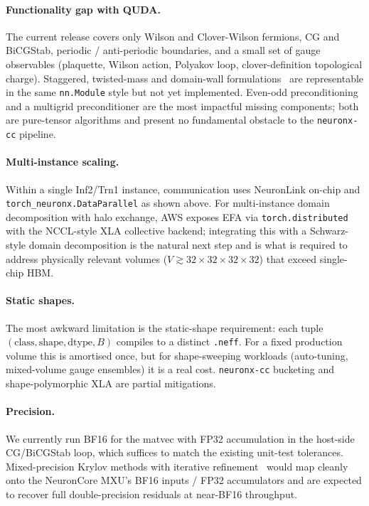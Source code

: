 \documentclass[a4paper,11pt]{article}
\newcommand{\NEFF}{\texttt{.neff}}
\begin{document}
\paragraph*{Functionality gap with QUDA.}
The current release covers only Wilson and Clover-Wilson fermions, CG
and BiCGStab, periodic / anti-periodic boundaries, and a small set of
gauge observables (plaquette, Wilson action, Polyakov loop,
clover-definition topological charge). Staggered, twisted-mass and
domain-wall formulations~\cite{Kogut:1974ag,Frezzotti:2000nk,Kaplan:1992bt}
are representable in the same \texttt{nn.Module} style but not yet implemented.
Even-odd preconditioning and a multigrid preconditioner are the most
impactful missing components; both are pure-tensor algorithms and
present no fundamental obstacle to the \texttt{neuronx-cc} pipeline.

\paragraph*{Multi-instance scaling.}
Within a single Inf2/Trn1 instance, communication uses NeuronLink
on-chip and \texttt{torch\_neuronx.DataParallel} as shown above. For
multi-instance domain decomposition with halo exchange, AWS exposes
EFA via \texttt{torch.distributed} with the NCCL-style XLA collective
backend; integrating this with a Schwarz-style domain decomposition
is the natural next step and is what is required to address physically
relevant volumes ($V\!\gtrsim\!32{\times}32{\times}32{\times}32$) that exceed single-chip HBM.

\paragraph*{Static shapes.}
The most awkward limitation is the static-shape requirement:
each tuple
$(\mathrm{class},\mathrm{shape},\mathrm{dtype},B)$
compiles to a distinct \NEFF. For a fixed production volume this is amortised once,
but for shape-sweeping workloads (auto-tuning, mixed-volume gauge
ensembles) it is a real cost. \texttt{neuronx-cc} bucketing and
shape-polymorphic XLA are partial mitigations.

\paragraph*{Precision.}
We currently run BF16 for the matvec with FP32 accumulation in the
host-side CG/BiCGStab loop, which suffices to match the existing
unit-test tolerances. Mixed-precision Krylov methods with iterative
refinement~\cite{Clark:2009wm} would map cleanly onto the NeuronCore
MXU's BF16 inputs / FP32 accumulators and are expected to recover full
double-precision residuals at near-BF16 throughput.
\end{document}
